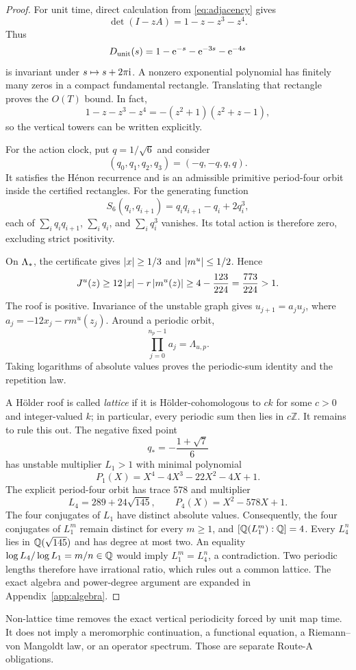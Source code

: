 \begin{proof}
For unit time, direct calculation from \eqref{eq:adjacency} gives
\begin{equation}
 \det(I-zA)=1-z-z^3-z^4.
 \label{eq:unit-z}
\end{equation}
Thus
\[
 D_{\rm unit}(s)=1-\mathrm{e}^{-s}-\mathrm{e}^{-3s}-\mathrm{e}^{-4s}
\]
is invariant under \(s\mapsto s+2\pi\mathrm{i}\).  A nonzero exponential polynomial
has finitely many zeros in a compact fundamental rectangle.  Translating that
rectangle proves the \(O(T)\) bound.  In fact,
\[
 1-z-z^3-z^4=-(z^2+1)(z^2+z-1),
\]
so the vertical towers can be written explicitly.

For the action clock, put \(q=1/\sqrt6\) and consider
\[
 (q_0,q_1,q_2,q_3)=(-q,-q,q,q).
\]
It satisfies the H\'enon recurrence and is an admissible primitive period-four
orbit inside the certified rectangles.  For the generating function
\[
 S_6(q_i,q_{i+1})=q_iq_{i+1}-q_i+2q_i^3,
\]
each of
\(\sum_iq_iq_{i+1}\), \(\sum_iq_i\), and \(\sum_iq_i^3\) vanishes.  Its
total action is therefore zero, excluding strict positivity.

On \(\Lambda_*\), the certificate gives \(\left|x\right|\ge1/3\) and
\(\left|m^u\right|\le1/2\).  Hence
\begin{equation}
 J^u(z)\ge12\left|x\right|-r\left|m^u(z)\right|
 \ge4-\frac{123}{224}=\frac{773}{224}>1.
 \label{eq:positive}
\end{equation}
The roof is positive.  Invariance of the unstable graph gives
\(u_{j+1}=a_ju_j\), where \(a_j=-12x_j-rm^u(z_j)\).  Around a periodic orbit,
\[
 \prod_{j=0}^{n_p-1}a_j=\Lambda_{u,p}.
\]
Taking logarithms of absolute values proves the periodic-sum identity and the
repetition law.

A H\"older roof is called \emph{lattice} if it is H\"older-cohomologous to
\(c k\) for some \(c>0\) and integer-valued \(k\); in particular, every
periodic sum then lies in \(c\mathbb Z\).  It remains to rule this out.  The
negative fixed point
\[
 q_*=-\frac{1+\sqrt7}{6}
\]
has unstable multiplier \(L_1>1\) with minimal polynomial
\begin{equation}
 P_1(X)=X^4-4X^3-22X^2-4X+1.
 \label{eq:p1}
\end{equation}
The explicit period-four orbit has trace \(578\) and multiplier
\[
 L_4=289+24\sqrt{145},
 \qquad
 P_4(X)=X^2-578X+1.
 \]
The four conjugates of \(L_1\) have distinct absolute values.  Consequently,
the four conjugates of \(L_1^m\) remain distinct for every \(m\ge1\), and
\([\mathbb{Q}(L_1^m):\mathbb{Q}]=4\).  Every \(L_4^n\) lies in
\(\mathbb{Q}(\sqrt{145})\) and has degree at most two.  An equality
\(\log L_4/\log L_1=m/n\in\mathbb{Q}\) would imply \(L_1^m=L_4^n\), a contradiction.
Two periodic lengths therefore have irrational ratio, which rules out a
common lattice.
The exact algebra and power-degree argument are expanded in
Appendix~\ref{app:algebra}.
\end{proof}

\begin{remark}
Non-lattice time removes the exact vertical periodicity forced by unit map
time.  It does not imply a meromorphic continuation, a functional equation, a
Riemann--von Mangoldt law, or an operator spectrum.  Those are separate
Route-A obligations.
\end{remark}

